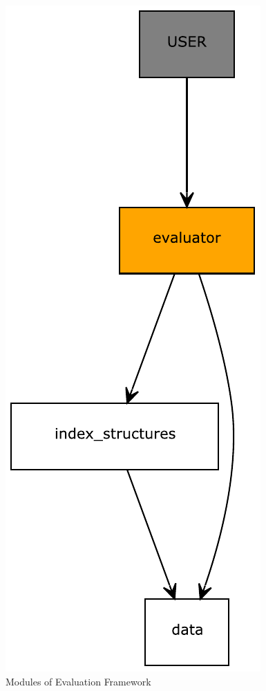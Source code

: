\begin{figure}
	\vspace{-40pt}
	\begin{center}
		\includegraphics[scale=0.4]{figures/evaluation_framework.pdf}
	\end{center}
	\vspace{-20pt}
	\caption{Modules of Evaluation Framework}
	\label{fig:evaluation-framework}
\end{figure}

